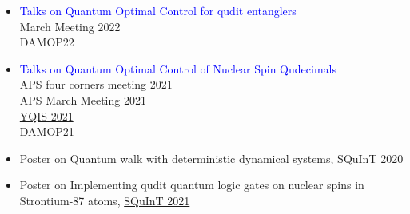 \documentclass[14pt]{moderncv}
\begin{document}
\begin{minipage}{.95\textwidth}
\begin{itemize}
    \item \textcolor{blue}{Talks on Quantum Optimal Control for qudit entanglers }\\
     March Meeting 2022\\
     DAMOP22\\
    \item \textcolor{blue}{Talks on Quantum Optimal Control of Nuclear Spin Qudecimals }\\
     APS four corners meeting 2021\\
APS March Meeting 2021\\
\href{https://indico.frib.msu.edu/event/31/overview}{YQIS 2021}\\
\href{https://meetings.aps.org/Meeting/DAMOP21/Session/S08.8}{DAMOP21}
\item Poster on Quantum walk with deterministic dynamical systems,
\href{http://physics.unm.edu/SQuInT/2020/poster_abstracts.php}{SQuInT 2020}
\item Poster on Implementing qudit quantum logic gates on nuclear spins in Strontium-87 atoms, \href{http://physics.unm.edu/SQuInT/2021/poster_abstracts.php}{SQuInT 2021}\\
\end{itemize}
\end{minipage}

\\
\end{document}
